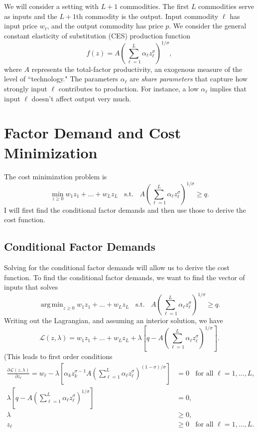 \documentclass[12pt]{article}
\DeclareMathOperator*{\argmin}{arg\,min}
\theoremstyle{definition}
\begin{document}
\maketitle
\singlespace
We will consider a setting with $L+1$ commodities. The first $L$ commodities serve as inputs and the $L+1$th commodity is the output. Input commodity $\ell$ has input price $w_{\ell}$, and the output commodity has price $p$. We consider the general constant elasticity of substitution (CES) production function
	\[	f(z)=A \left(\sum_{\ell = 1}^L \alpha_{\ell} z_{\ell}^{\sigma} \right)^{1 / \sigma},\]
where $A$ represents the total-factor productivity, an exogenous measure of the level of ``technology." The parameters $\alpha_{\ell}$ are \emph{share parameters} that capture how strongly input $\ell$ contributes to production. For instance, a low $\alpha_{\ell}$ implies that input $\ell$ doesn't affect output very much. 


\section{Factor Demand and Cost Minimization}
The cost minimization problem is
	\[	\min_{z \geq 0} w_1z_1 + ... + w_{L}z_{L}  \;\; \text{ s.t. } \;\; A \left(\sum_{\ell = 1}^L \alpha_{\ell} z_{\ell}^{\sigma} \right)^{1 / \sigma} \geq q. \]	
I will first find the conditional factor demands and then use those to derive the cost function. 
    
    
\subsection{Conditional Factor Demands}
	Solving for the conditional factor demands will allow us to derive the cost function. To find the conditional factor demands, we want to find the vector of inputs that solves
	\[	\argmin_{z \geq 0} w_1z_1 + ... + w_{L}z_{L}  \;\; \text{ s.t. } \;\; A \left(\sum_{\ell = 1}^L \alpha_{\ell} z_{\ell}^{\sigma} \right)^{1 / \sigma} \geq q. \]	
	Writing out the Lagrangian, and assuming an interior solution, we have
	\[	\mathcal{L}(z, \lambda) = 	w_1z_1 + ... + w_{L}z_{L}  + \lambda \left[q - A \left(\sum_{\ell = 1}^L \alpha_{\ell} z_{\ell}^{\sigma} \right)^{1 / \sigma} \right] . \]
	(This leads to first order conditions
\begin{align}
	\frac{\partial \mathcal{L}(z, \lambda)}{\partial z_{\ell}} = w_{\ell} - \lambda \left[  \alpha_k z_k^{\sigma - 1} A \left(\sum_{\ell = 1}^L \alpha_{\ell} z_{\ell}^{\sigma} \right)^{(1 - \sigma)/\sigma} \right] &= 0  \;\; \text{ for all } {\ell}=1,...,L, \label{costfoc1}\\
	 \lambda \left[q - A \left(\sum_{\ell = 1}^L \alpha_{\ell} z_{\ell}^{\sigma} \right)^{1 / \sigma} \right] &=0, \label{costfoc2}\\
     \lambda &\geq 0,\\
     z_{\ell} &\geq 0 \;\; \text{ for all } \ell=1, ..., L.     
\end{align}	
\end{document}

